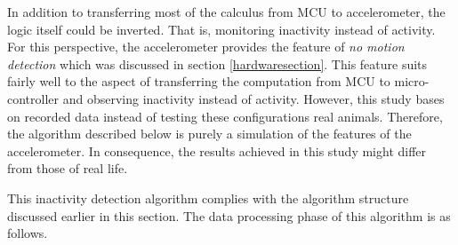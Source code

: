 \documentclass[english,12pt,a4paper,pdftex,elec,utf8]{aaltothesis}
\begin{document}
In addition to transferring most of the calculus from MCU to accelerometer, the logic itself could be inverted. That is, monitoring inactivity instead of activity. For this perspective, the accelerometer provides the feature of \textit{no motion detection} which was discussed in section \ref{hardwaresection}. This feature suits fairly well to the aspect of transferring the computation from MCU to micro-controller and observing inactivity instead of activity. However, this study bases on recorded data instead of testing these configurations real animals. Therefore, the algorithm described below is purely a simulation of the features of the accelerometer. In consequence, the results achieved in this study might differ from those of real life. 

This inactivity detection algorithm complies with the algorithm structure discussed earlier in this section. The data processing phase of this algorithm is as follows. 
\end{document}
